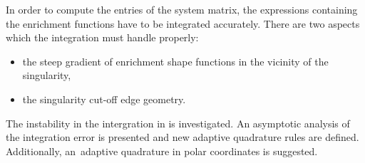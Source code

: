 

In order to compute the entries of the system matrix, %
the expressions containing the enrichment functions have to be integrated accurately. 
% 
There are two aspects which the integration must handle properly:
\begin{itemize}
  \item the steep gradient of enrichment shape functions in the vicinity of the singularity,
  \item the singularity cut-off edge geometry.
\end{itemize}

The instability in the intergration in \cite{gracie_modelling_2010} is investigated.
An asymptotic analysis of the integration error is presented and new adaptive quadrature rules are defined.
Additionally, an~adaptive quadrature in polar coordinates is suggested.

